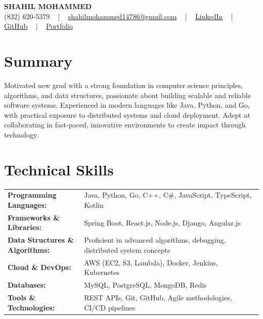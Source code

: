 \documentclass[letterpaper,11pt]{article}
\begin{document}
\begin{center}
    {\fontsize{14pt}{12pt}\selectfont \textbf{\MakeUppercase{Shahil Mohammed}}}\\ \vspace{2pt}
    \fontsize{10pt}{12pt}\selectfont (832) 620-5379 ~ | ~ \href{mailto:shahilmohammed14786@gmail.com}{shahilmohammed14786@gmail.com} ~ | ~  
    \href{https://www.linkedin.com/in/shahil-mohammed-9652931a1/}{\color{blue}\underline{LinkedIn}}  ~ | ~ 
    \href{https://github.com/freakbeast14}{\color{blue}\underline{GitHub}} ~ | ~ 
    \href{https://shahil-mohammed.netlify.app/}{\color{blue}\underline{Portfolio}}
    \vspace{-8pt}
\end{center}

\section{Summary}
\fontsize{9pt}{10pt}\selectfont
Motivated new grad with a strong foundation in computer science principles, algorithms, and data structures, passionate about building scalable and reliable software systems. Experienced in modern languages like Java, Python, and Go, with practical exposure to distributed systems and cloud deployment. Adept at collaborating in fast-paced, innovative environments to create impact through technology.
 \vspace{-5pt}
 
\section{Technical Skills}
        \vspace{-14pt}
        \begin{table}[h]
            \fontsize{9pt}{10pt}\selectfont
            \begin{tabular}{p{0.3\linewidth} p{0.7\linewidth}}
                \textbf{Programming Languages:} & Java, Python, Go, C++, C\#, JavaScript, TypeScript, Kotlin \\
                \textbf{Frameworks \& Libraries:} & Spring Boot, React.js, Node.js, Django, Angular.js \\
                \textbf{Data Structures \& Algorithms:} & Proficient in advanced algorithms, debugging, distributed system concepts \\
                \textbf{Cloud \& DevOps:} & AWS (EC2, S3, Lambda), Docker, Jenkins, Kubernetes \\
                \textbf{Databases:} & MySQL, PostgreSQL, MongoDB, Redis \\
                \textbf{Tools \& Technologies:} & REST APIs, Git, GitHub, Agile methodologies, CI/CD pipelines \\
            \end{tabular}
        \end{table}
 \vspace{-15pt}
 
\end{document}
